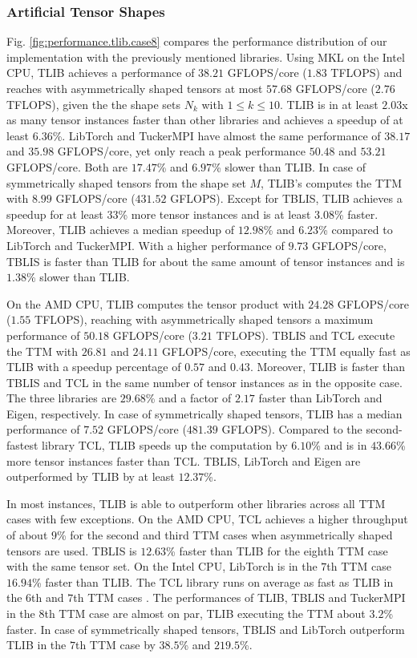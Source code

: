 \subsubsection{Artificial Tensor Shapes}
Fig. \ref{fig:performance.tlib.case8} compares the performance distribution of our implementation with the previously mentioned libraries.
Using MKL on the Intel CPU, TLIB achieves a performance of $38.21$ GFLOPS/core ($1.83$ TFLOPS) and reaches with asymmetrically shaped tensors at most $57.68$ GFLOPS/core ($2.76$ TFLOPS), given the the shape sets $N_k$ with $1 \leq k \leq 10$.
TLIB is in at least $2.03$x as many tensor instances faster than other libraries and achieves a speedup of at least $6.36$\%.
LibTorch and TuckerMPI have almost the same performance of $38.17$ and $35.98$ GFLOPS/core, yet only reach a peak performance $50.48$ and $53.21$ GFLOPS/core.
Both are $17.47$\% and $6.97$\% slower than TLIB.
In case of symmetrically shaped tensors from the shape set $M$, TLIB's computes the TTM with $8.99$ GFLOPS/core ($431.52$ GFLOPS).
Except for TBLIS, TLIB achieves a speedup for at least $33$\% more tensor instances and is at least $3.08$\% faster.
Moreover, TLIB achieves a median speedup of $12.98$\% and $6.23$\% compared to LibTorch and TuckerMPI.
With a higher performance of $9.73$ GFLOPS/core, TBLIS is faster than TLIB for about the same amount of tensor instances and is $1.38$\% slower than TLIB.

On the AMD CPU, TLIB computes the tensor product with $24.28$ GFLOPS/core ($1.55$ TFLOPS), reaching with asymmetrically shaped tensors a maximum performance of $50.18$ GFLOPS/core ($3.21$ TFLOPS).
TBLIS and TCL execute the TTM with $26.81$ and $24.11$ GFLOPS/core, executing the TTM equally fast as TLIB with a speedup percentage of $0.57$ and $0.43$.
Moreover, TLIB is faster than TBLIS and TCL in the same number of tensor instances as in the opposite case.
The three libraries are $29.68$\% and a factor of $2.17$ faster than LibTorch and Eigen, respectively.
In case of symmetrically shaped tensors, TLIB has a median performance of $7.52$ GFLOPS/core ($481.39$ GFLOPS).
Compared to the second-fastest library TCL, TLIB speeds up the computation by $6.10$\% and is in $43.66$\% more tensor instances faster than TCL.
TBLIS, LibTorch and Eigen are outperformed by TLIB by at least $12.37$\%.

In most instances, TLIB is able to outperform other libraries across all TTM cases with few exceptions.
On the AMD CPU, TCL achieves a higher throughput of about $9$\% for the second and third TTM cases when asymmetrically shaped tensors are used.
TBLIS is $12.63$\% faster than TLIB for the eighth TTM case with the same tensor set.
On the Intel CPU, LibTorch is in the $7$th TTM case $16.94$\% faster than TLIB.
The TCL library runs on average as fast as TLIB in the $6$th and $7$th TTM cases .
The performances of TLIB, TBLIS and TuckerMPI in the $8$th TTM case are almost on par, TLIB executing the TTM about $3.2$\% faster.
In case of symmetrically shaped tensors, TBLIS and LibTorch outperform TLIB in the $7$th TTM case by $38.5$\% and $219.5$\%.


